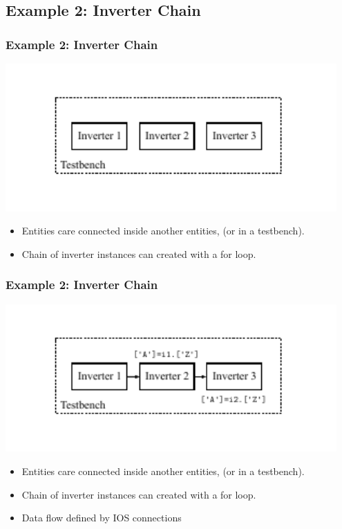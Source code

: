 \documentclass{sdkslides}
\begin{document}

\renewcommand{\sectionname}{Example 2: Inverter Chain}
\subsection*{\sectionname}
\begin{frame}[t]
    \frametitle{\sectionname}
    \begin{center}
        \includegraphics[width=0.95\textwidth]{Pics/inverter_chain_0}
    \end{center}
    \begin{itemize}
        \item Entities care connected inside another entities, (or in a
            testbench).
        \item Chain of inverter instances can created with a for loop.
    \end{itemize}
\end{frame}

\begin{frame}[t]
    \frametitle{\sectionname}
    \begin{center}
        \includegraphics[width=0.95\textwidth]{Pics/inverter_chain_2}
    \end{center}
    \begin{itemize}
        \item Entities care connected inside another entities, (or in a
            testbench).
        \item Chain of inverter instances can created with a for loop.
        \item Data flow defined by IOS connections
    \end{itemize}
\end{frame}
\end{document}
